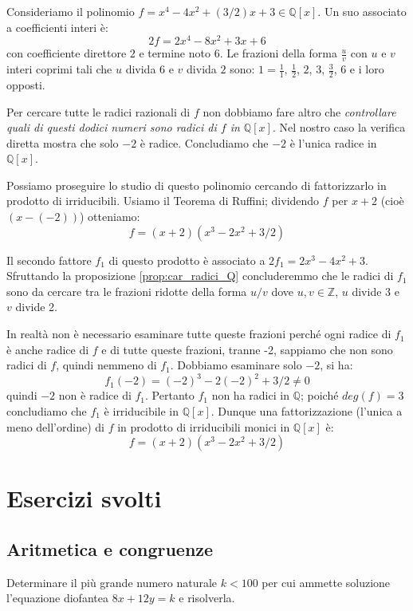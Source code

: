 \begin{example}
	Consideriamo il polinomio $f=x^{4}-4x^{2}+(3/2)x+3 \in \mathbb{Q}[x]$. Un suo associato a coefficienti interi è: $$2f=2x^{4}-8x^{2}+3x+6$$
	con coefficiente direttore $2$ e termine noto $6$. Le frazioni della forma $\frac{u}{v}$ con $u$ e $v$ interi coprimi tali che $u$ divida $6$ e $v$ divida $2$ sono: $1=\frac{1}{1}$, $\frac{1}{2}$, $2$, $3$, $\frac{3}{2}$, $6$ e i loro opposti. 
	
	Per cercare tutte le radici razionali di $f$ non dobbiamo fare altro che \textit{controllare quali di questi dodici numeri sono radici di $f$ in $\mathbb{Q}[x]$}. Nel nostro caso la verifica diretta mostra che solo $-2$ è radice. Concludiamo che $-2$ è l'unica radice in $\mathbb{Q}[x]$.
	
	Possiamo proseguire lo studio di questo polinomio cercando di fattorizzarlo in prodotto di irriducibili. Usiamo il Teorema di Ruffini; dividendo $f$ per $x+2$ (cioè $(x-(-2))$) otteniamo: $$f=(x+2)(x^{3}-2x^{2}+3/2)$$
	
	Il secondo fattore $f_{1}$ di questo prodotto è associato a $2f_{1}=2x^{3}-4x^{2}+3$. Sfruttando la proposizione \ref{prop:car_radici_Q} concluderemmo che le radici di $f_{1}$ sono da cercare tra le frazioni ridotte della forma $u/v$ dove $u,v \in \mathbb{Z}$, $u$ divide 3 e $v$ divide 2. 
	
	In realtà non è necessario esaminare tutte queste frazioni perché ogni radice di $f_{1}$ è anche radice di $f$ e di tutte queste frazioni, tranne -2, sappiamo che non sono radici di $f$, quindi nemmeno di $f_{1}$. Dobbiamo esaminare solo $-2$, si ha: $$f_{1}(-2)=(-2)^{3}-2(-2)^{2}+3/2\neq 0$$quindi $-2$ non è radice di $f_{1}$. Pertanto $f_{1}$ non ha radici in $\mathbb{Q}$; poiché $deg(f)=3$ concludiamo che $f_{1}$ è irriducibile in $\mathbb{Q}[x]$. 	Dunque una fattorizzazione (l'unica a meno dell'ordine) di $f$ in prodotto di irriducibili monici in $\mathbb{Q}[x]$ è: \[f=(x+2)(x^{3}-2x^{2}+3/2)\]
\end{example}
\newpage
\section{Esercizi svolti}
\subsection{Aritmetica e congruenze}
\begin{exsbox}
	Determinare il più grande numero naturale $k<100$ per cui ammette soluzione l'equazione diofantea $8x+12y=k$ e risolverla.
\end{exsbox}

